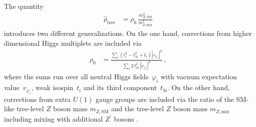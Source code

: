 \documentclass[final,3p,11pt,pdflatex]{elsarticle}
\newcommand{\SM}{\ensuremath{\text{SM}}\xspace}
\begin{document}
The quantity
%
\begin{align}
  \hat\rho_\text{tree} &= \rho_0\,\frac{m_{Z,\SM}^2}{m_{Z,\text{mix}}^2}
  \label{eq:rho_hat_tree}
\end{align}
%
introduces two different generalizations. On the one hand, corrections
from higher dimensional Higgs multiplets are included via \cite{Langacker:1991an}
%
\begin{align}
  \rho_0 &= \frac{\sum_i \left(t_i^2 - t_{3i}^2 + t_i \right)|v_{\varphi_i}|^2}
   {\sum_i 2\,t_{3i}^2\,|v_{\varphi_i}|^2}\,,
\end{align}
%
where the sums run over all neutral Higgs fields~$\varphi_i$ with vacuum
expectation value~$v_{\varphi_i}$, weak isospin~$t_i$ and its third
component~$t_{3i}$. On the other hand, corrections from extra $U(1)$
gauge groups are included via the ratio of the SM-like tree-level $Z$
boson mass $m_{Z,\SM}$ and the tree-level $Z$ boson mass $m_{Z,\text{mix}}$
including mixing with additional $Z^\prime$ bosons
\cite{Degrassi:1989mu,Leike:1991if}.
\end{document}
